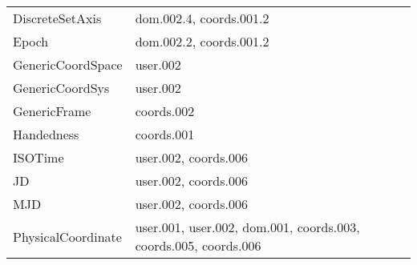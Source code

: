 \begin{longtable}[l]{|l|l|}
        DiscreteSetAxis                   & dom.002.4, coords.001.2                     \\
        Epoch                             & dom.002.2, coords.001.2                     \\
        GenericCoordSpace                 & user.002                                    \\
        GenericCoordSys                   & user.002                                    \\
        GenericFrame                      & coords.002                                  \\
        Handedness                        & coords.001                                  \\
        ISOTime                           & user.002, coords.006                        \\
        JD                                & user.002, coords.006                        \\
        MJD                               & user.002, coords.006                        \\
        PhysicalCoordinate                & user.001, user.002, dom.001, coords.003, coords.005, coords.006 \\

\end{longtable}
